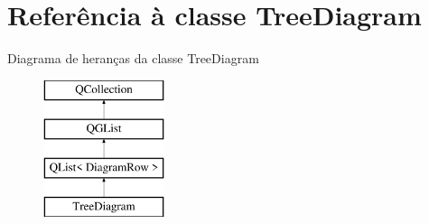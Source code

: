 \hypertarget{class_tree_diagram}{\section{Referência à classe Tree\-Diagram}
\label{class_tree_diagram}
}
Diagrama de heranças da classe Tree\-Diagram\begin{figure}[H]
\begin{center}
\leavevmode
\includegraphics[height=4.000000cm]{class_tree_diagram}
\end{center}
\end{figure}
